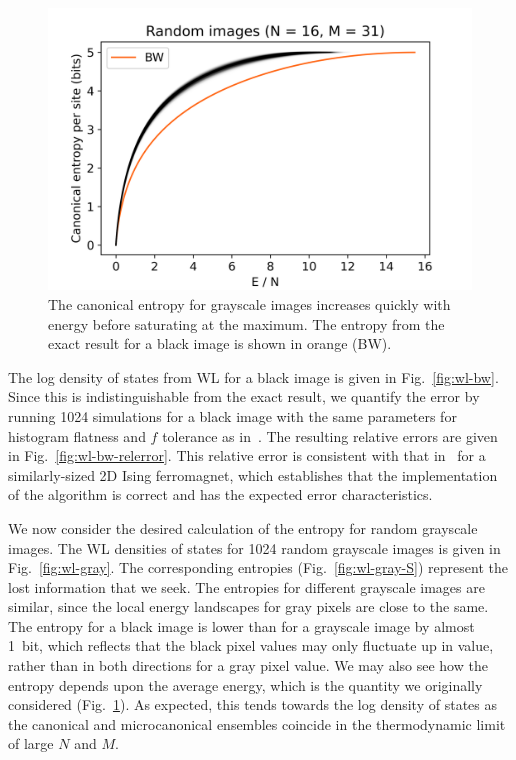 \documentclass[aps,reprint,floatfix]{revtex4-2}
\theoremstyle{plain}
\theoremstyle{definition}
\begin{document}
\begin{figure}
  \centering
  \includegraphics[width=\linewidth]{wanglandau-gray-ES}
  \caption{The canonical entropy for grayscale images increases quickly with
    energy before saturating at the maximum. The entropy from the exact result
  for a black image is shown in orange (BW).}\label{fig:wl-gray-ES}
\end{figure}

The log density of states from WL for a black image is given in
Fig.~\ref{fig:wl-bw}. Since this is indistinguishable from the exact result, we
quantify the error by running \num{1024} simulations for a black image with the
same parameters for histogram flatness and $f$ tolerance as
in~\cite{wanglandau-ajp}. The resulting relative errors are given in
Fig.~\ref{fig:wl-bw-relerror}. This relative error is consistent with that
in~\cite{wanglandau-ajp} for a similarly-sized 2D Ising ferromagnet, which
establishes that the implementation of the algorithm is correct and has the
expected error characteristics.

We now consider the desired calculation of the entropy for random grayscale
images. The WL densities of states for \num{1024} random grayscale images is
given in Fig.~\ref{fig:wl-gray}. The corresponding entropies
(Fig.~\ref{fig:wl-gray-S}) represent the lost information that we seek. The
entropies for different grayscale images are similar, since the local energy
landscapes for gray pixels are close to the same. The entropy for a black image
is lower than for a grayscale image by almost \SI{1}{bit}, which reflects that
the black pixel values may only fluctuate up in value, rather than in both
directions for a gray pixel value. We may also see how the entropy depends upon
the average energy, which is the quantity we originally considered
(Fig.~\ref{fig:wl-gray-ES}). As expected, this tends towards the log density of
states as the canonical and microcanonical ensembles coincide in the
thermodynamic limit of large $N$ and $M$.
\end{document}
